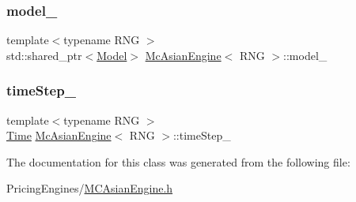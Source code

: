 \hypertarget{class_mc_asian_engine_ae23208fbc0b859e7bfc13821a709c852}{}\label{class_mc_asian_engine_ae23208fbc0b859e7bfc13821a709c852} 
\subsubsection{\texorpdfstring{model\+\_\+}{model\_}}
{\footnotesize\ttfamily template$<$typename R\+NG $>$ \\
std\+::shared\+\_\+ptr$<$\hyperlink{class_model}{Model}$>$ \hyperlink{class_mc_asian_engine}{Mc\+Asian\+Engine}$<$ R\+NG $>$\+::model\+\_\+\hspace{0.3cm}{\ttfamily [private]}}

\hypertarget{class_mc_asian_engine_a0dadab191a7097d0e474ebf084f6bca8}{}\label{class_mc_asian_engine_a0dadab191a7097d0e474ebf084f6bca8} 
\subsubsection{\texorpdfstring{time\+Step\+\_\+}{timeStep\_}}
{\footnotesize\ttfamily template$<$typename R\+NG $>$ \\
\hyperlink{_name_def_8h_ac2d3e0ba793497bcca555c7c2cf64ff3}{Time} \hyperlink{class_mc_asian_engine}{Mc\+Asian\+Engine}$<$ R\+NG $>$\+::time\+Step\+\_\+\hspace{0.3cm}{\ttfamily [private]}}



The documentation for this class was generated from the following file\+:\begin{DoxyCompactItemize}
\item 
Pricing\+Engines/\hyperlink{_m_c_asian_engine_8h}{M\+C\+Asian\+Engine.\+h}\end{DoxyCompactItemize}
